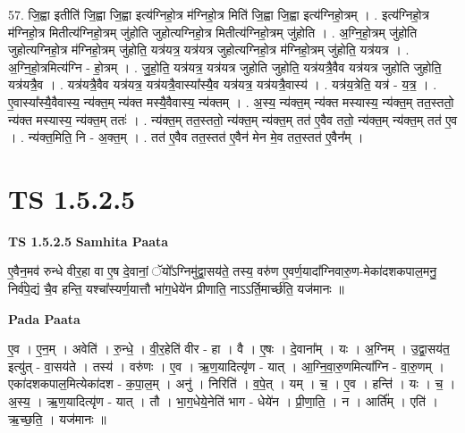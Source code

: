 \documentclass[17pt]{extarticle}
\begin{document}
57. जि॒ह्वा इतीति॑ जि॒ह्वा जि॒ह्वा इत्य॑ग्निहो॒त्र म॑ग्निहो॒त्र मिति॑ जि॒ह्वा जि॒ह्वा इत्य॑ग्निहो॒त्रम् । . इत्य॑ग्निहो॒त्र म॑ग्निहो॒त्र मितीत्य॑ग्निहो॒त्रम् जु॑होति जुहोत्यग्निहो॒त्र मितीत्य॑ग्निहो॒त्रम् जु॑होति । . अ॒ग्नि॒हो॒त्रम् जु॑होति जुहोत्यग्निहो॒त्र म॑ग्निहो॒त्रम् जु॑होति॒ यत्र॑यत्र॒ यत्र॑यत्र जुहोत्यग्निहो॒त्र म॑ग्निहो॒त्रम् जु॑होति॒ यत्र॑यत्र । . अ॒ग्नि॒हो॒त्रमित्य॑ग्नि - हो॒त्रम् । . जु॒हो॒ति॒ यत्र॑यत्र॒ यत्र॑यत्र जुहोति जुहोति॒ यत्र॑यत्रै॒वैव यत्र॑यत्र जुहोति जुहोति॒ यत्र॑यत्रै॒व । . यत्र॑यत्रै॒वैव यत्र॑यत्र॒ यत्र॑यत्रै॒वास्या᳚स्यै॒व यत्र॑यत्र॒ यत्र॑यत्रै॒वास्य॑ । . यत्र॑य॒त्रेति॒ यत्र॑ - य॒त्र॒ । . ए॒वास्या᳚स्यै॒वैवास्य॒ न्य॑क्त॒म् न्य॑क्त मस्यै॒वैवास्य॒ न्य॑क्तम् । . अ॒स्य॒ न्य॑क्त॒म् न्य॑क्त मस्यास्य॒ न्य॑क्त॒म् तत॒स्ततो॒ न्य॑क्त मस्यास्य॒ न्य॑क्त॒म् ततः॑ । . न्य॑क्त॒म् तत॒स्ततो॒ न्य॑क्त॒म् न्य॑क्त॒म् तत॑ ए॒वैव ततो॒ न्य॑क्त॒म् न्य॑क्त॒म् तत॑ ए॒व । . न्य॑क्त॒मिति॒ नि - अ॒क्त॒म् । . तत॑ ए॒वैव तत॒स्तत॑ ए॒वैन॑ मेन मे॒व तत॒स्तत॑ ए॒वैन᳚म् । \newline
\pagebreak
{}
\section*{ TS 1.5.2.5 }

\textbf{TS 1.5.2.5 } \newline
\textbf{Samhita Paata} \newline

ए॒वैन॒मव॑ रुन्धे वीर॒हा वा ए॒ष दे॒वानां॒ ॅयो᳚ऽग्निमु॑द्वा॒सय॑ते॒ तस्य॒ वरु॑ण ए॒वर्ण॒यादा᳚ग्निवारु॒ण-मेका॑दशकपाल॒मनु॒ निर्व॑पे॒द्यं चै॒व हन्ति॒ यश्चा᳚स्यर्ण॒यात्तौ भा॑ग॒धेये॑न प्रीणाति॒ नाऽऽर्ति॒मार्च्छ॑ति॒ यज॑मानः ॥ \newline

\textbf{Pada Paata} \newline

ए॒व । ए॒न॒म् । अवेति॑ । रु॒न्धे॒ । वी॒र॒हेति॑ वीर - हा । वै । ए॒षः । दे॒वाना᳚म् । यः । अ॒ग्निम् । उ॒द्वा॒सय॑त॒ इत्यु॑त् - वा॒सय॑ते । तस्य॑ । वरु॑णः । ए॒व । ऋ॒ण॒यादित्यृ॑ण - यात् । आ॒ग्नि॒वा॒रु॒णमित्या᳚ग्नि - वा॒रु॒णम् । एका॑दशकपाल॒मित्येका॑दश - क॒पा॒ल॒म् । अनु॑ । निरिति॑ । व॒पे॒त् । यम् । च॒ । ए॒व । हन्ति॑ । यः । च॒ । अ॒स्य॒ । ऋ॒ण॒यादित्यृ॑ण - यात् । तौ । भा॒ग॒धेये॒नेति॑ भाग - धेये॑न । प्री॒णा॒ति॒ । न । आर्ति᳚म् । एति॑ । ऋ॒च्छ॒ति॒ । यज॑मानः ॥  \newline
\end{document}
